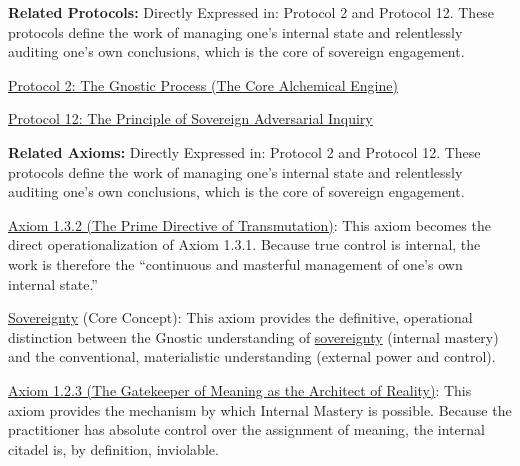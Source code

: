 \documentclass{article}
\begin{document}
\begin{nobullet}
    \item \textbf{Related Protocols:} Directly Expressed in: Protocol 2 and Protocol 12. These protocols define the work of managing one's internal state and relentlessly auditing one's own conclusions, which is the core of sovereign engagement.
        \begin{nobullet}
            \item \hyperref[protocol_2_the_gnostic_process_the_core_alchemical_engine]{Protocol 2: The Gnostic Process (The Core Alchemical Engine)} 
            \item \hyperref[protocol_12_the_principle_of_sovereign_adversarial_inquiry]{Protocol 12: The Principle of Sovereign Adversarial Inquiry}
        \end{nobullet}

    \item \textbf{Related Axioms:} Directly Expressed in: Protocol 2 and Protocol 12. These protocols define the work of managing one's internal state and relentlessly auditing one's own conclusions, which is the core of sovereign engagement.
        \begin{nobullet}
            \item \hyperref[axiom_1_3_2_the_prime_directive_of_transmutation]{Axiom 1.3.2 (The Prime Directive of Transmutation)}: This axiom becomes the direct operationalization of Axiom 1.3.1. Because true control is internal, the work is therefore the ``continuous and masterful management of one's own internal state.''
            \item \hyperlink{gloss:sovereignty}{Sovereignty} (Core Concept): This axiom provides the definitive, operational distinction between the Gnostic understanding of \hyperlink{gloss:sovereignty}{sovereignty} (internal mastery) and the conventional, materialistic understanding (external power and control).
            \item \hyperref[axiom_1_2_3_the_gatekeeper_of_meaning_as_the_architect_of_reality]{Axiom 1.2.3 (The Gatekeeper of Meaning as the Architect of Reality)}: This axiom provides the mechanism by which Internal Mastery is possible. Because the practitioner has absolute control over the assignment of meaning, the internal citadel is, by definition, inviolable.
        \end{nobullet}

\end{nobullet}
\end{document}
